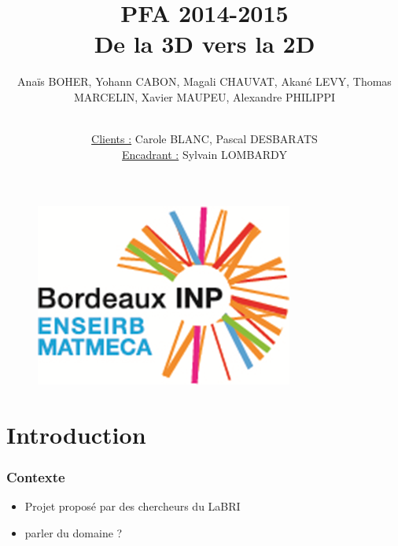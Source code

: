 \documentclass{beamer}
\title[PFA 2014-2015]{PFA 2014-2015 \\ \LARGE De la 3D vers la 2D} %
\author{Anaïs BOHER, Yohann CABON, Magali CHAUVAT, Akané LEVY, Thomas MARCELIN, Xavier MAUPEU, Alexandre PHILIPPI
\\ \and \\
\underline{Clients :} Carole BLANC, Pascal DESBARATS 
\\
\underline{Encadrant :} Sylvain LOMBARDY}
\institute[Enseirb-Matmeca] %
{École Nationale Supérieure d'Électronique, Informatique, Télécommunications, Mathématique et Mécanique de Bordeaux
}
\date{} %
\begin{document}
\graphicspath{{./images/}{.}}





\begin{frame}
\titlepage %

\begin{figure}[B]
\vspace*{-1cm}
\includegraphics[scale=0.4]{logo.png}
\end{figure}
\end{frame}



\section{Introduction}

\begin{frame}
\frametitle{Contexte}

\begin{itemize}[label=$\bullet$]
\item Projet proposé par des chercheurs du LaBRI
\item parler du domaine ?
\end{itemize}
\end{frame}


\end{document}
